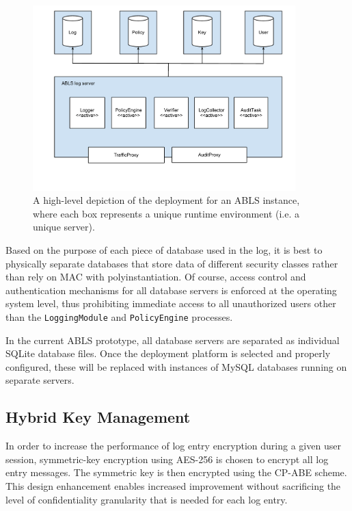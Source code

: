 \documentclass{sig-alternate}
\begin{document}
\begin{figure}[htb!]
\begin{center}
\includegraphics[width=4in]{images/deployment.pdf}
\caption{A high-level depiction of the deployment for an ABLS instance, where each box represents a unique runtime environment (i.e. a unique server).}
\label{fig:deployment}
\end{center}
\end{figure}

Based on the purpose of each piece of database used in the log, it is best to physically separate databases
that store data of different security classes rather than rely on MAC with polyinstantiation. Of course, access control
and authentication mechanisms for all database servers is enforced at the operating system level, thus
prohibiting immediate access to all unauthorized users other than the {\tt LoggingModule} and {\tt PolicyEngine} 
processes. 

In the current ABLS prototype, all database servers are separated as individual SQLite database files. Once
the deployment platform is selected and properly configured, these will be replaced with instances of MySQL 
databases running on separate servers.

\subsection{Hybrid Key Management}
\label{sec:keyMgmt}
In order to increase the performance of log entry encryption during a given user session, symmetric-key encryption
using AES-256 is chosen to encrypt all log entry messages. The symmetric key is then encrypted using the CP-ABE
scheme. This design enhancement enables increased improvement without sacrificing the level of confidentiality 
granularity that is needed for each log entry. 
\end{document}
